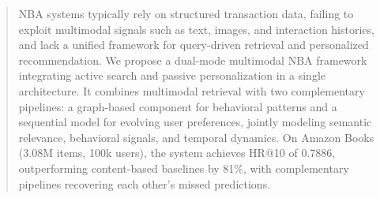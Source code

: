 \begin{abstract}
NBA systems typically rely on structured transaction data, failing to exploit multimodal signals such as text, images, and interaction histories, and lack a unified framework for query-driven retrieval and personalized recommendation. We propose a dual-mode multimodal NBA framework integrating active search and passive personalization in a single architecture. It combines multimodal retrieval with two complementary pipelines: a graph-based component for behavioral patterns and a sequential model for evolving user preferences, jointly modeling semantic relevance, behavioral signals, and temporal dynamics.
On Amazon Books (3.08M items, 100k users), the system achieves HR@10 of 0.7886, outperforming content-based baselines by 81\%, with complementary pipelines recovering each other’s missed predictions.


%
\end{abstract}
